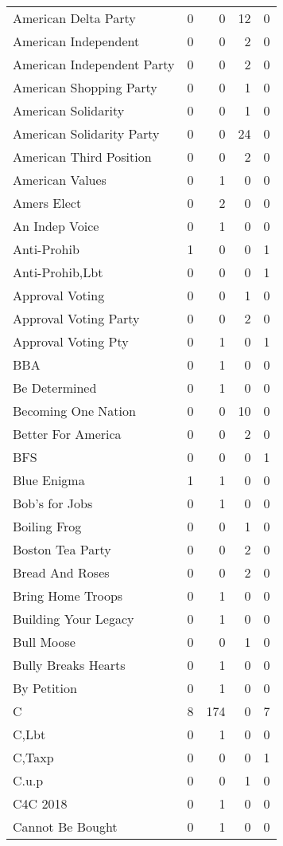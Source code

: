 \begin{supertabular}{lrrrr}
American Delta Party & 0 & 0 & 12 & 0\\
American Independent & 0 & 0 & 2 & 0\\
American Independent Party & 0 & 0 & 2 & 0\\
American Shopping Party & 0 & 0 & 1 & 0\\
American Solidarity & 0 & 0 & 1 & 0\\
American Solidarity Party & 0 & 0 & 24 & 0\\
American Third Position & 0 & 0 & 2 & 0\\
American Values & 0 & 1 & 0 & 0\\
Amers Elect & 0 & 2 & 0 & 0\\
An Indep Voice & 0 & 1 & 0 & 0\\
Anti-Prohib & 1 & 0 & 0 & 1\\
Anti-Prohib,Lbt & 0 & 0 & 0 & 1\\
Approval Voting & 0 & 0 & 1 & 0\\
Approval Voting Party & 0 & 0 & 2 & 0\\
Approval Voting Pty & 0 & 1 & 0 & 1\\
BBA & 0 & 1 & 0 & 0\\
Be Determined & 0 & 1 & 0 & 0\\
Becoming One Nation & 0 & 0 & 10 & 0\\
Better For America & 0 & 0 & 2 & 0\\
BFS & 0 & 0 & 0 & 1\\
Blue Enigma & 1 & 1 & 0 & 0\\
Bob's for Jobs & 0 & 1 & 0 & 0\\
Boiling Frog & 0 & 0 & 1 & 0\\
Boston Tea Party & 0 & 0 & 2 & 0\\
Bread And Roses & 0 & 0 & 2 & 0\\
Bring Home Troops & 0 & 1 & 0 & 0\\
Building Your Legacy & 0 & 1 & 0 & 0\\
Bull Moose & 0 & 0 & 1 & 0\\
Bully Breaks Hearts & 0 & 1 & 0 & 0\\
By Petition & 0 & 1 & 0 & 0\\
C & 8 & 174 & 0 & 7\\
C,Lbt & 0 & 1 & 0 & 0\\
C,Taxp & 0 & 0 & 0 & 1\\
C.u.p & 0 & 0 & 1 & 0\\
C4C 2018 & 0 & 1 & 0 & 0\\
Cannot Be Bought & 0 & 1 & 0 & 0\\

\end{supertabular}

